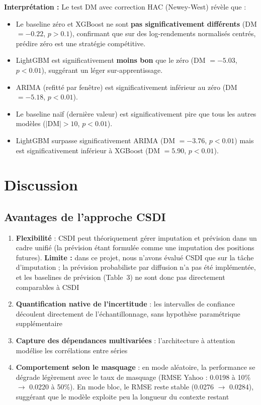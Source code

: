 \documentclass[12pt,a4paper]{article}
\begin{document}
\textbf{Interpr\'etation :} Le test DM avec correction HAC (Newey-West) r\'ev\`ele que :
\begin{itemize}
    \item Le baseline z\'ero et XGBoost ne sont \textbf{pas significativement diff\'erents} (DM $= -0.22$, $p > 0.1$), confirmant que sur des log-rendements normalis\'es centr\'es, pr\'edire z\'ero est une strat\'egie comp\'etitive.
    \item LightGBM est significativement \textbf{moins bon} que le z\'ero (DM $= -5.03$, $p < 0.01$), sugg\'erant un l\'eger sur-apprentissage.
    \item ARIMA (refitt\'e par fen\^etre) est significativement inf\'erieur au z\'ero (DM $= -5.18$, $p < 0.01$).
    \item Le baseline na\"if (derni\`ere valeur) est significativement pire que tous les autres mod\`eles ($|$DM$| > 10$, $p < 0.01$).
    \item LightGBM surpasse significativement ARIMA (DM $= -3.76$, $p < 0.01$) mais est significativement inf\'erieur \`a XGBoost (DM $= 5.90$, $p < 0.01$).
\end{itemize}

\section{Discussion}

\subsection{Avantages de l'approche CSDI}

\begin{enumerate}
    \item \textbf{Flexibilit\'e} : CSDI peut th\'eoriquement g\'erer imputation et pr\'evision dans un cadre unifi\'e (la pr\'evision \'etant formul\'ee comme une imputation des positions futures). \textbf{Limite :} dans ce projet, nous n'avons \'evalu\'e CSDI que sur la t\^ache d'imputation ; la pr\'evision probabiliste par diffusion n'a pas \'et\'e impl\'ement\'ee, et les baselines de pr\'evision (Table~3) ne sont donc pas directement comparables \`a CSDI
    \item \textbf{Quantification native de l'incertitude} : les intervalles de confiance d\'ecoulent directement de l'\'echantillonnage, sans hypoth\`ese param\'etrique suppl\'ementaire
    \item \textbf{Capture des d\'ependances multivari\'ees} : l'architecture \`a attention mod\'elise les corr\'elations entre s\'eries
    \item \textbf{Comportement selon le masquage} : en mode al\'eatoire, la performance se d\'egrade l\'eg\`erement avec le taux de masquage (RMSE Yahoo : 0.0198 \`a 10\% $\to$ 0.0220 \`a 50\%). En mode bloc, le RMSE reste stable (0.0276 $\to$ 0.0284), sugg\'erant que le mod\`ele exploite peu la longueur du contexte restant
\end{enumerate}
\end{document}
